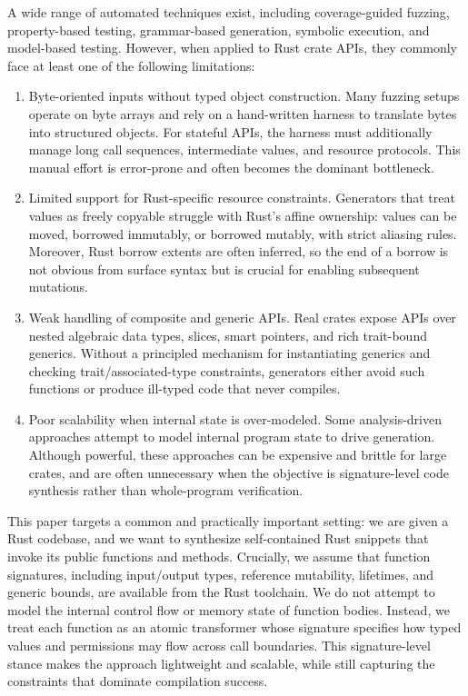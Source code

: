 \documentclass[sigconf]{acmart}
\begin{document}
A wide range of automated techniques exist, including coverage-guided fuzzing, property-based testing, grammar-based generation,
symbolic execution, and model-based testing. However, when applied to Rust crate APIs, they commonly face at least one of the following limitations:
\begin{enumerate}
  \item[1.] Byte-oriented inputs without typed object construction.
  Many fuzzing setups operate on byte arrays and rely on a hand-written harness to translate bytes into structured objects.
  For stateful APIs, the harness must additionally manage long call sequences, intermediate values, and resource protocols.
  This manual effort is error-prone and often becomes the dominant bottleneck.

  \item[2.] Limited support for Rust-specific resource constraints.
  Generators that treat values as freely copyable struggle with Rust's affine ownership: values can be moved, borrowed immutably, or borrowed mutably, with strict aliasing rules. Moreover, Rust borrow extents are often inferred, so the end of a borrow is not obvious from surface syntax but is crucial for enabling subsequent mutations.

  \item[3.] Weak handling of composite and generic APIs.
  Real crates expose APIs over nested algebraic data types, slices, smart pointers, and rich trait-bound generics.
  Without a principled mechanism for instantiating generics and checking trait/associated-type constraints, generators either avoid such functions or produce ill-typed code that never compiles.

  \item[4.] Poor scalability when internal state is over-modeled.
  Some analysis-driven approaches attempt to model internal program state to drive generation. Although powerful, these approaches can be expensive and brittle for large crates,
  and are often unnecessary when the objective is signature-level code synthesis rather than whole-program verification.
\end{enumerate}

This paper targets a common and practically important setting:
we are given a Rust codebase, and we want to synthesize self-contained Rust snippets that invoke its public functions and methods. Crucially, we assume that function signatures, including input/output types, reference mutability, lifetimes, and generic bounds, are available from the Rust toolchain. We do not attempt to model the internal control flow or memory state of function bodies. Instead, we treat each function as an atomic transformer whose signature specifies how typed values and permissions may flow across call boundaries. This signature-level stance makes the approach lightweight and scalable, while still capturing the constraints that dominate compilation success.
\end{document}
